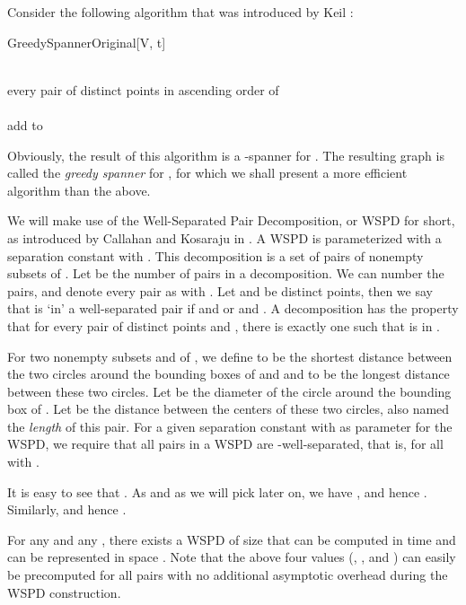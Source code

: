 \documentclass[runningheads,envcountsame,oribibl,orivec]{llncs}
\begin{document}
Consider the following algorithm that was introduced by Keil \cite{Keil:1988:ACE:61764.61787}:

\pagebreak

\begin{algorithm}{GreedySpannerOriginal}[V, t]{\label{algo:greedyorig}}
  
  \\ \qfor every pair of distinct points  in ascending order of 
  \\ \qdo \qif 
       \\ \qthen add  to 
          \qendif
     \qendfor
  \\ \qreturn 
\end{algorithm}

Obviously, the result of this algorithm is a -spanner for . The resulting graph is called the \emph{greedy spanner} for , for which we shall present a more efficient algorithm than the above.

We will make use of the Well-Separated Pair Decomposition, or WSPD for short, as introduced by Callahan and Kosaraju in \cite{Callahan95dealingwith,Callahan:1995:DMP:200836.200853}. A WSPD is parameterized with a separation constant  with . This decomposition is a set of pairs of nonempty subsets of . Let  be the number of pairs in a decomposition. We can number the pairs, and denote every pair as  with . Let  and  be distinct points, then we say that  is `in' a well-separated pair  if  and  or  and . A decomposition has the property that for every pair of distinct points  and , there is exactly one  such that  is in .

For two nonempty subsets  and  of , we define  to be the shortest distance between the two circles around the bounding boxes of  and  and  to be the longest distance between these two circles. Let  be the diameter of the circle around the bounding box of . Let  be the distance between the centers of these two circles, also named the \emph{length} of this pair. For a given separation constant  with  as parameter for the WSPD, we require that all pairs in a WSPD are -well-separated, that is,  for all  with .

It is easy to see that . As  and as we will pick  later on, we have , and hence . Similarly,  and hence .

For any  and any , there exists a WSPD of size  that can be computed in  time and can be represented in  space \cite{Callahan95dealingwith}. Note that the above four values (, ,  and ) can easily be precomputed for all pairs with no additional asymptotic overhead during the WSPD construction.
\end{document}
